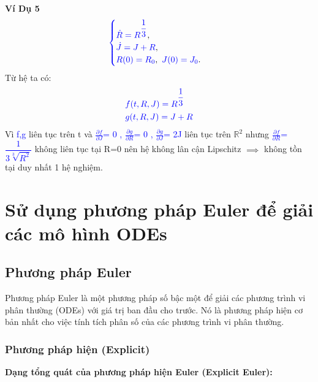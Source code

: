 \documentclass[a4paper]{article}
\begin{document}
   \textbf{Ví Dụ 5} 
 \begin{align}
	    \textcolor{blue}{
	    \begin{cases}
            \dot R = R^{\dfrac{1}{3}}\textcolor{black}{,}\\
            \dot J = J+R\textcolor{black}{,}\\
            R(0) = R_0\textcolor{black}{,} \enskip J(0) = J_0 \textcolor{black}{.}
        \end{cases}
        }
        \label{label9}
	\end{align}
 Từ hệ ta có:
 \begin{align}
    &\textcolor{blue}{ f(t,R,J)= R^{\dfrac{1}{3}}}\\ &\textcolor{blue}{ g(t,R,J)=J+R}
 \end{align}
  Vì \textcolor{blue}{f,g} liên tục trên t và \textcolor{blue}{  $\frac{\partial f}{\partial J}$= 0 , $\frac{\partial g}{\partial R}$= 0  , $\frac{\partial g}{\partial J}$= 2J}  liên tục trên $\mathbb{R}^{2}$  nhưng \textcolor{blue}{  $\frac{\partial f}{\partial R}$= $\dfrac{1}{3\sqrt[3]{R^{2}}}$} không liên tục tại R=0 nên hệ không lân cận Lipschitz $\implies$ không tồn tại duy nhất 1 hệ nghiệm.
\section{Sử dụng phương pháp Euler để giải các mô hình ODEs}
	\subsection{Phương pháp Euler}
	Phương pháp Euler là một phương pháp số bậc một để giải các phương trình vi phân thường (ODEs) với giá trị ban đầu cho trước. Nó là phương pháp hiện cơ bản nhất cho việc tính tích phân số của các phương trình vi phân thường.
	\subsubsection{Phương pháp hiện (Explicit)}
        {\bfseries Dạng tổng quát của phương pháp hiện Euler (Explicit Euler):}
\end{document}

